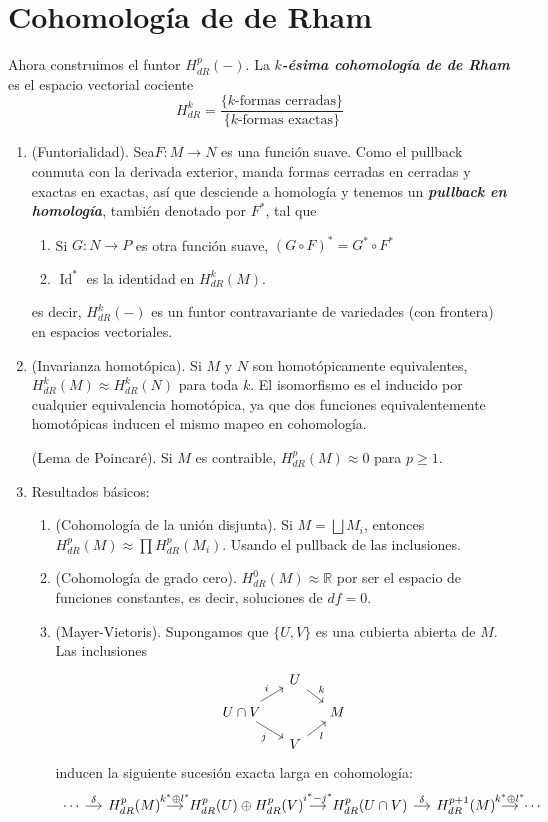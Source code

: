 \documentclass[spanish]{article}
\theoremstyle{definition}
\newcommand{\R}{\mathbb{R}}
\DeclareMathOperator{\Id}{Id}
\begin{document}
	\section{Cohomología de de Rham}\label{sec:3}
	Ahora construimos el funtor $H_{dR}^p(-)$. La \textbf{\textit{$k$-ésima cohomología de de Rham}} es el espacio vectorial cociente
	\[H_{dR}^k=\frac{\{k\text{-formas cerradas}\}}{\{k\text{-formas exactas}\}}\]
	\begin{enumerate}		
		\item (Funtorialidad). Sea$F:M\to N$ es una función suave. Como el pullback 
		conmuta con la derivada exterior, manda formas cerradas en cerradas y exactas en exactas, así que desciende a homología y tenemos un \textbf{\textit{pullback en homología}}, también denotado por $F^*$, tal que
		\begin{enumerate}
			\item Si $G:N\to P$ es otra función suave, $(G\circ F)^*=G^*\circ F^*$
			\item $\Id^*$ es la identidad en $H_{dR}^k(M)$.
		\end{enumerate}
		es decir, $H_{dR}^k(-)$ es un funtor contravariante de variedades (con frontera) en espacios vectoriales.
		
		\item (Invarianza homotópica). Si $M$ y $N$ son homotópicamente equivalentes, $H_{dR}^k(M)\approx H_{dR}^k(N)$ para toda $k$. El isomorfismo es el inducido por cualquier equivalencia homotópica, ya que dos funciones equivalentemente homotópicas inducen el mismo mapeo en cohomología.
		
		(Lema de Poincaré). Si $M$ es contraible, $H_{dR}^p(M)\approx0$ para $p\geq1$.
		
		\item Resultados básicos:
		\begin{enumerate}
			\item (Cohomología de la unión disjunta). Si $M=\bigsqcup M_i$, entonces $H_{dR}^p(M)\approx \prod H_{dR}^p(M_i)$. Usando el pullback de las inclusiones.
			
			\item (Cohomología de grado cero). $H_{dR}^0(M)\approx\R$ por ser el espacio de funciones constantes, es decir, soluciones de $df=0$.
			
			\item (Mayer-Vietoris). Supongamos que $\{U,V\}$ es una cubierta abierta de $M$. Las inclusiones
			\[\begin{tikzcd}[column sep=small,row sep=small]
				&U\arrow[dr,"k"]\\
				U\cap V\arrow[ru,"i"]\arrow[dr,swap,"j"]&&M\\
				&V\arrow[ru,swap,"l"]
			\end{tikzcd}\]
			inducen la siguiente sucesión exacta larga en cohomología:
			\[\begin{tikzcd}[column sep=small]
				\cdots\arrow[r,"\delta"]&H_{dR}^p(M)\arrow[r,"k^*\oplus l^*"]&H_{dR}^p(U)\oplus H_{dR}^p(V)\arrow[r,"i^*-j^*"]&H_{dR}^p(U\cap V)\arrow[r,"\delta"]&H_{dR}^{p+1}(M)\arrow[r,"k^*\oplus l^*"]&\cdots
			\end{tikzcd}\]
		\end{enumerate}
		

\end{enumerate}
\end{document}
